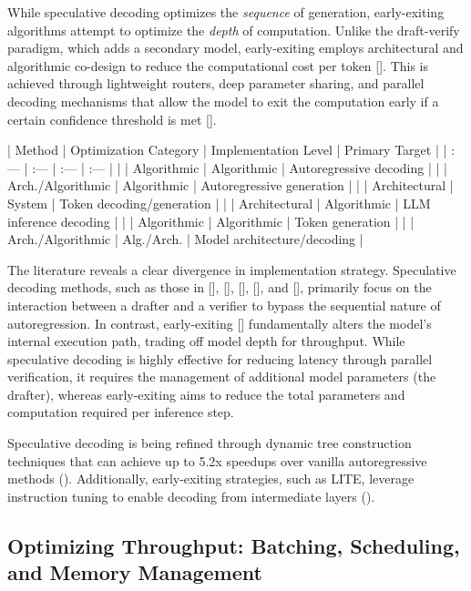 \documentclass[11pt]{article}
\begin{document}
While speculative decoding optimizes the \textit{sequence} of generation, early-exiting algorithms attempt to optimize the \textit{depth} of computation. Unlike the draft-verify paradigm, which adds a secondary model, early-exiting employs architectural and algorithmic co-design to reduce the computational cost per token [\citep{2509.05915}]. This is achieved through lightweight routers, deep parameter sharing, and parallel decoding mechanisms that allow the model to exit the computation early if a certain confidence threshold is met [\citep{2509.05915}].

| Method | Optimization Category | Implementation Level | Primary Target |
| :--- | :--- | :--- | :--- |
| \citep{2211.17192} | Algorithmic | Algorithmic | Autoregressive decoding |
| \citep{2302.07863} | Arch./Algorithmic | Algorithmic | Autoregressive generation |
| \citep{2305.09781} | Architectural | System | Token decoding/generation |
| \citep{2312.12728} | Architectural | Algorithmic | LLM inference decoding |
| \citep{2406.16758} | Algorithmic | Algorithmic | Token generation |
| \citep{2509.05915} | Arch./Algorithmic | Alg./Arch. | Model architecture/decoding |

The literature reveals a clear divergence in implementation strategy. Speculative decoding methods, such as those in [\citep{2211.17192}], [\citep{2302.07863}], [\citep{2305.09781}], [\citep{2312.12728}], and [\citep{2406.16758}], primarily focus on the interaction between a drafter and a verifier to bypass the sequential nature of autoregression. In contrast, early-exiting [\citep{2509.05915}] fundamentally alters the model's internal execution path, trading off model depth for throughput. While speculative decoding is highly effective for reducing latency through parallel verification, it requires the management of additional model parameters (the drafter), whereas early-exiting aims to reduce the total parameters and computation required per inference step.

Speculative decoding is being refined through dynamic tree construction techniques that can achieve up to 5.2x speedups over vanilla autoregressive methods (\citep{2510.26577}). Additionally, early-exiting strategies, such as LITE, leverage instruction tuning to enable decoding from intermediate layers (\citep{2310.18581}).
\subsection{Optimizing Throughput: Batching, Scheduling, and Memory Management}
\end{document}
